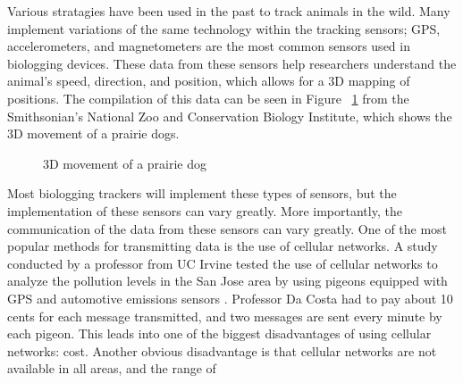 \documentclass[sigplan,screen,nonacm]{acmart}
\begin{document}
Various stratagies have been used in the past to track animals in the wild. Many
implement variations of the same technology within the tracking sensors;
GPS, accelerometers, and magnetometers are the most common sensors used in
biologging devices. These data from these sensors help researchers understand
the animal's  speed, direction, and position, which allows for a 3D mapping of
positions\cite{Kidangoor_2024}. The compilation of this data can be seen in Figure ~\ref{fig:prairie_dog_3D_movement}
from the Smithsonian's National Zoo and Conservation Biology Institute, which
shows the 3D movement of a prairie dogs.
\begin{figure}[htbp]
  \centering
  \caption{3D movement of a prairie dog}
  \label{fig:prairie_dog_3D_movement}
\end{figure}
Most biologging trackers will implement these types of sensors, but the
implementation of these sensors can vary greatly. More importantly, the
communication of the data from these sensors can vary greatly. One of the
most popular methods for transmitting data is the use of cellular networks.
A study conducted by a professor from UC Irvine tested the use of cellular
networks to analyze the pollution levels in the San Jose area by using pigeons
equipped with GPS and automotive emissions sensors \cite{Martin_2006}. Professor
Da Costa had to pay about 10 cents for each message transmitted, and two
messages are sent every minute by each pigeon\cite{Martin_2006}. This leads into one of the biggest
disadvantages of using cellular networks: cost. Another obvious disadvantage
is that cellular networks are not available in all areas, and the range of
\end{document}
